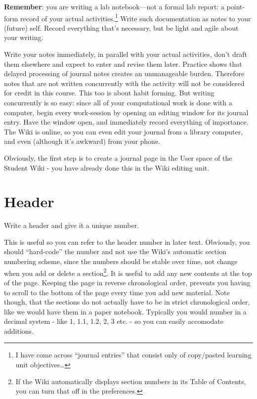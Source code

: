 \documentclass[]{book}
\let\rmarkdownfootnote\footnote%
\def\footnote{\protect\rmarkdownfootnote}
\begin{document}
\textbf{Remember}: you are writing a lab notebook---not a formal lab
report: a point-form record of your actual activities.\footnote{I have
  come across ``journal entries'' that consist only of copy/pasted
  learning unit objectives\ldots{}} Write such documentation as notes to
your (future) self. Record everything that's necessary, but be light and
agile about your writing.

Write your notes immediately, in parallel with your actual activities,
don't draft them elsewhere and expect to enter and revise them later.
Practice shows that delayed processing of journal notes creates an
unmanageable burden. Therefore notes that are not written concurrently
with the activity will not be considered for credit in this course. This
too is about habit forming. But writing concurrently is so easy: since
all of your computational work is done with a computer, begin every
work-session by opening an editing window for its journal entry. Have
the window open, and immediately record everything of importance. The
Wiki is online, so you can even edit your journal from a library
computer, and even (although it's awkward) from your phone.

Obviously, the first step is to create a journal page in the User space
of the Student Wiki - you have already done this in the Wiki editing
unit.

\section{Header}\label{header}

Write a header and give it a unique number.

This is useful so you can refer to the header number in later text.
Obviously, you should ``hard-code'' the number and not use the Wiki's
automatic section numbering scheme, since the numbers should be stable
over time, not change when you add or delete a section\footnote{If the
  Wiki automatically displays section numbers in its Table of Contents,
  you can turn that off in the preferences.}. It is useful to add any
new contents at the top of the page. Keeping the page in reverse
chronological order, prevents you having to scroll to the bottom of the
page every time you add new material. Note though, that the sections do
not actually have to be in strict chronological order, like we would
have them in a paper notebook. Typically you would number in a decimal
system - like 1, 1.1, 1.2, 2, 3 etc. - so you can easily accomodate
additions.
\end{document}
